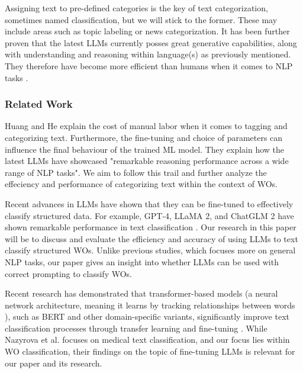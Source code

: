 \documentclass{article}
\begin{document}
Assigning text to pre-defined categories is the key of text categorization,
sometimes named classification, but we will stick to the former.
These may include areas such as topic labeling or news categorization.
It has been further proven that the latest LLMs currently posses great generative capabilities,
along with understanding and reasoning within language(s) as previously mentioned.
They therefore have become more efficient than humans when it comes to NLP tasks \cite{zhang2024}.

\subsubsection{Related Work}

Huang and He \cite{huang2024} explain the cost of manual labor when it comes to tagging and categorizing text.
Furthermore, the fine-tuning and choice of parameters can influence the final behaviour of the trained ML model.
They explain how the latest LLMs have showcased "remarkable reasoning performance across a wide range of
NLP tasks".
We aim to follow this trail and further analyze the effeciency and performance of categorizing text within the
context of WOs.

Recent advances in LLMs have shown that they can be fine-tuned to effectively classify structured data.
For example, GPT-4, LLaMA 2, and ChatGLM 2 have shown remarkable performance in text classification \cite{zhang2024}.
Our research in this paper will be to discuss and evaluate the efficiency and accuracy of using LLMs
to text classify structured WOs.
Unlike previous studies, which focuses more on general NLP tasks,
our paper gives an insight into whether LLMs can be used with correct prompting to classify WOs.

Recent research has demonstrated that transformer-based models
(a neural network architecture, meaning it learns by tracking relationships between words \cite{merritt2022}),
such as BERT and other domain-specific variants, significantly improve text classification processes through
transfer learning and fine-tuning \cite{nazyrova2024}.
While Nazyrova et al. focuses on medical text classification, and our focus lies within WO classification,
their findings on the topic of fine-tuning LLMs is relevant for our paper and its research.



\end{document}
